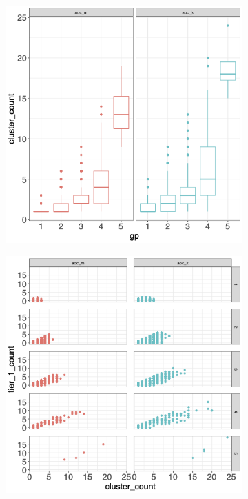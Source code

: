 \documentclass[12pt, oneside]{article}   	%
\begin{document}
\begin{figure}[H]
\centering
	\begin{subfigure}[t]{0.48\textwidth}
	 \centering
	 \includegraphics[width=\linewidth]{cluster_group.png} 
	 \end{subfigure}
 \hfill
	\begin{subfigure}[t]{0.48\textwidth}
        \centering
        \includegraphics[width=\linewidth]{tier_cluster.png} 

\end{subfigure}
\end{figure}
\end{document}

